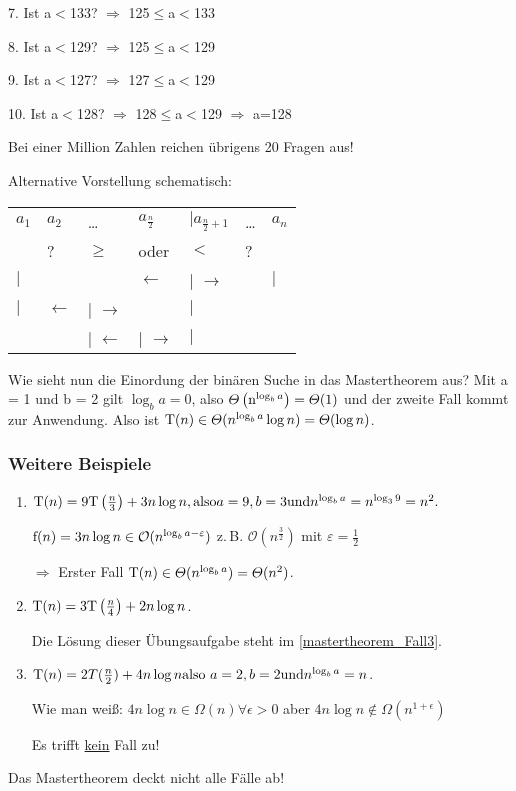 \documentclass[ngerman,draft,parskip=half*,twoside]{scrreprt}
\theoremstyle{break}
\theoremstyle{nonumberbreak}
\newcommand*{\OO}{\mathcal{O}}      %
\begin{document}
7. Ist a$<$133? $\Rightarrow$ 125$\leq$a$<$133

8. Ist a$<$129? $\Rightarrow$ 125$\leq$a$<$129

9. Ist a$<$127? $\Rightarrow$ 127$\leq$a$<$129

10. Ist a$<$128? $\Rightarrow$ 128$\leq$a$<$129 $\Rightarrow$ a=128 

Bei einer Million Zahlen reichen übrigens 20 Fragen aus!


% 
Alternative Vorstellung schematisch:

\begin{tabular}{lllllll}
$a_1$     & $a_2$           & \dots   &  $ a_{\frac{n}{2}}$ & $ \vert a_{\frac{n}{2}+1}$ & \dots  & $a_n$ \\
          &       ?         & $\geq$  & oder                  & $<$                          &  ?     &\\
$\vert$   &                 &         & $\gets$               & $\vert$ $\to$                &        & $\vert$\\
$\vert$   & $\gets$ & $\vert$ $\to$ & & $\vert$\\
&         & $\vert$ $\gets$ & $\vert$ $\to$ & $\vert$
\end{tabular}


Wie sieht nun die Einordung der binären Suche in das Mastertheorem aus?
Mit a = 1 und b = 2 gilt $\log_ba = 0$, also $\Theta\left(\textup{n}^{\log_ba}\right)=\Theta(1)$ und der zweite Fall kommt zur Anwendung.
Also ist $  \textup{T}(n) \in \Theta(n^{\log_ba}\log n)=\Theta(\log n) $.

\subsubsection{Weitere Beispiele}
\begin{enumerate}
\item $ \textup{T}(n) = 9 \textup{T}\left(\frac{n}{3}\right) + 3 n\log n, \textup{also}a = 9,b = 3
\textup{und}n^{\log_ba} = n^{\log_39} = n^2.$

$\textup{f}(n) = 3n\log n \in \OO(n^{\log_ba-\varepsilon}) $
z.\,B. $\OO(n^{\frac{3}{2}})$ mit $ \varepsilon = \frac{1}{2} $

$ \Rightarrow $ Erster Fall $ \textup{T}(n) \in \Theta(n^{\log_ba}) = \Theta (n^2) $.

\item $ \textup{T}(n) = 3 \textup{T}\left(\frac{n}{4}\right) + 2n\log n$.

Die Lösung dieser Übungsaufgabe steht im \autoref{mastertheorem_Fall3}.

\item $ \textup{T}(n) = 2 T(\frac{n}{2}) + 4n\log n\textup{also}\
a = 2,b = 2\textup{und}n^{\log_ba} = n $.

Wie man weiß: $4n\log n \in \Omega(n)\forall \epsilon >0$ aber $4n\log n \notin \Omega(n^{1+\epsilon})$
	
Es trifft {\underline {kein}} Fall zu!
\end{enumerate}
Das Mastertheorem deckt nicht alle Fälle ab!
	
\end{document}
